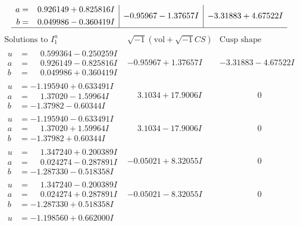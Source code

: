 \documentclass[1p]{elsarticle_modified}
\theoremstyle{definition}
\newcommand{\I}{\sqrt{-1}}
\begin{document}
$$\begin{array}{c|c|c}
\begin{aligned}
a &= \phantom{-}0.926149 + 0.825816 I \\
b &= \phantom{-}0.049986 - 0.360419 I\end{aligned}
 & -0.95967 - 1.37657 I & -3.31883 + 4.67522 I\\
 \hline 
 \end{array}$$\newpage$$\begin{array}{c|c|c}  
\text{Solutions to }I^u_{1}& \I (\text{vol} + \sqrt{-1}CS) & \text{Cusp shape}\\
 \hline 
\begin{aligned}
u &= \phantom{-}0.599364 - 0.250259 I \\
a &= \phantom{-}0.926149 - 0.825816 I \\
b &= \phantom{-}0.049986 + 0.360419 I\end{aligned}
 & -0.95967 + 1.37657 I & -3.31883 - 4.67522 I \\ \hline\begin{aligned}
u &= -1.195940 + 0.633491 I \\
a &= \phantom{-}1.37020 - 1.59964 I \\
b &= -1.37982 - 0.60344 I\end{aligned}
 & \phantom{-}3.1034 + 17.9006 I & \phantom{-0.000000 } 0 \\ \hline\begin{aligned}
u &= -1.195940 - 0.633491 I \\
a &= \phantom{-}1.37020 + 1.59964 I \\
b &= -1.37982 + 0.60344 I\end{aligned}
 & \phantom{-}3.1034 - 17.9006 I & \phantom{-0.000000 } 0 \\ \hline\begin{aligned}
u &= \phantom{-}1.347240 + 0.200389 I \\
a &= \phantom{-}0.024274 - 0.287891 I \\
b &= -1.287330 - 0.518358 I\end{aligned}
 & -0.05021 + 8.32055 I & \phantom{-0.000000 } 0 \\ \hline\begin{aligned}
u &= \phantom{-}1.347240 - 0.200389 I \\
a &= \phantom{-}0.024274 + 0.287891 I \\
b &= -1.287330 + 0.518358 I\end{aligned}
 & -0.05021 - 8.32055 I & \phantom{-0.000000 } 0 \\ \hline\begin{aligned}
u &= -1.198560 + 0.662000 I \\

\end{aligned}
\end{array}$$
\end{document}
